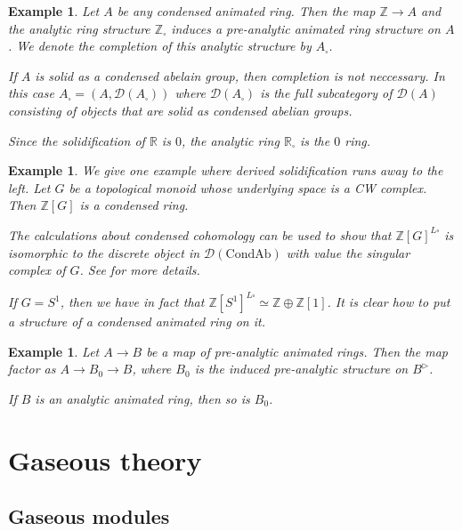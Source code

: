 \documentclass{article}
\theoremstyle{plain}
\newtheorem{exmp}[thm]{Example}
\theoremstyle{definition}
\theoremstyle{remark}
\newcommand{\huflag}{\triangleright}
\newcommand{\D}{\mathcal{D}}
\newcommand{\solid}{\square}
\begin{document}
\begin{exmp}
Let $ A $ be any condensed animated ring. Then the map $ \mathbb{Z}\to A $ and the analytic ring structure
$ \mathbb{Z}_{\solid} $ induces a pre-analytic animated ring structure on $ A $.
We denote the completion of this analytic structure by $ A _{\solid} $.

If $ A $ is solid as a condensed abelain group, then completion is not neccessary.
In this case $ A _{\solid} = (A, \D (A _{\solid})) $ where $ \D (A _{\solid}) $ is the full subcategory
of $ \D (A) $ consisting of objects that are solid as condensed abelian groups.

Since the solidification of $ \mathbb{R} $ is $ 0 $, the analytic ring $ \mathbb{R}_{\solid} $ is the $ 0 $ ring.
\end{exmp}

\begin{exmp}
We give one example where derived solidification runs away to the left.
Let $ G $ be a topological monoid whose underlying space is a CW complex.
Then $ \mathbb{Z}[G] $ is a condensed ring.

The calculations about condensed cohomology can be used to show that $ \mathbb{Z}[G]^{L\solid} $
is isomorphic to the discrete object in $ \D (\mathrm{CondAb}) $ with value the singular complex of $ G $.
See
\cite[\href{https://www.youtube.com/watch?v=KKzt6C9ggWA\&list=PLx5f8IelFRgGmu6gmL-Kf\_Rl\_6Mm7juZO\&index=6\&t=1090s}{Video 6, 18:10}]{ihesvid}
for more details.

If $ G = S ^{1} $, then we have in fact that $ \mathbb{Z}[S ^{1}]^{L\solid} \simeq \mathbb{Z} \oplus \mathbb{Z}[1] $.
It is clear how to put a structure of a condensed animated ring on it.
\end{exmp}

\begin{exmp}
Let $ A\to B $ be a map of pre-analytic animated rings.
Then the map factor as $ A \to B _{0}\to B $, where $ B _{0}$ is the induced pre-analytic
structure on $ B ^{\huflag} $.

If $ B $ is an analytic animated ring, then so is $ B _{0} $.
\end{exmp}

\section{Gaseous theory}

\subsection{Gaseous modules}
\end{document}

